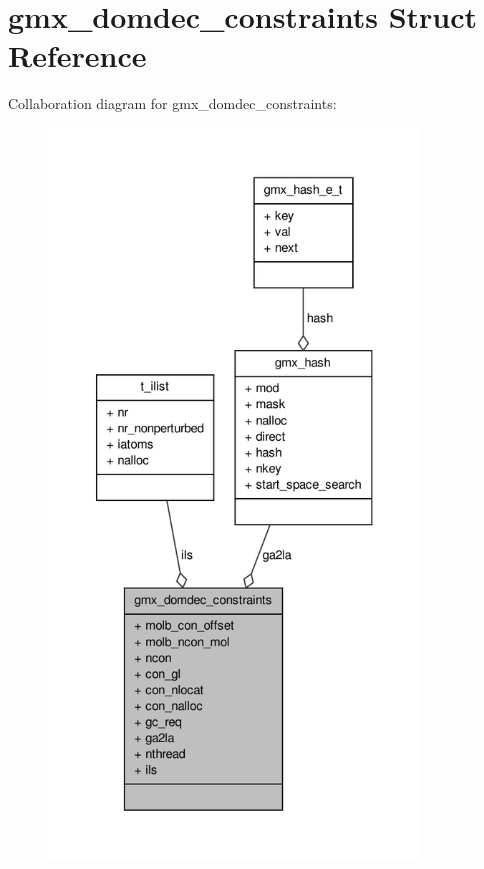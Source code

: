 \hypertarget{structgmx__domdec__constraints}{\section{gmx\-\_\-domdec\-\_\-constraints \-Struct \-Reference}
\label{structgmx__domdec__constraints}
}


\-Collaboration diagram for gmx\-\_\-domdec\-\_\-constraints\-:
\nopagebreak
\begin{figure}[H]
\begin{center}
\leavevmode
\includegraphics[height=550pt]{structgmx__domdec__constraints__coll__graph}
\end{center}
\end{figure}
